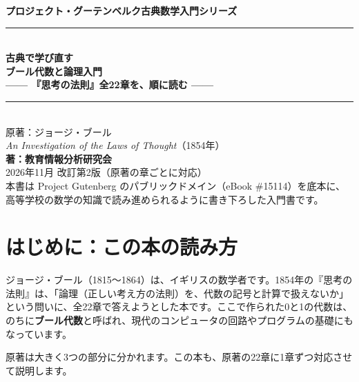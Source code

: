 \documentclass[a4paper,11pt,openany]{ltjsbook}
\begin{document}
\begin{titlepage}
\begin{center}
\vspace*{1.5cm}
{\Large\bfseries プロジェクト・グーテンベルク古典数学入門シリーズ}\\[0.8cm]
\rule{\textwidth}{1.5pt}\\[0.4cm]
{\Huge\bfseries 古典で学び直す\\ブール代数と論理入門}\\[0.4cm]
{\Large\bfseries —— 『思考の法則』全22章を、順に読む ——}\\[0.4cm]
\rule{\textwidth}{1.5pt}\\[1.5cm]
{\large 原著：ジョージ・ブール\\
\textit{An Investigation of the Laws of Thought}（1854年）}\\[2.0cm]
{\Large\bfseries 著：教育情報分析研究会}\\[2.5cm]
\vfill
{\large 2026年11月 改訂第2版（原著の章ごとに対応）}\\[0.5cm]
{\footnotesize 本書は Project Gutenberg のパブリックドメイン（eBook \#15114）を底本に、\\
高等学校の数学の知識で読み進められるように書き下ろした入門書です。}
\end{center}
\end{titlepage}

\frontmatter
\tableofcontents
\mainmatter

\chapter*{はじめに：この本の読み方}

ジョージ・ブール（1815〜1864）は、イギリスの数学者です。1854年の『思考の法則』は、「論理（正しい考え方の法則）を、代数の記号と計算で扱えないか」という問いに、全22章で答えようとした本です。ここで作られた0と1の代数は、のちに\textbf{ブール代数}と呼ばれ、現代のコンピュータの回路やプログラムの基礎にもなっています。

原著は大きく3つの部分に分かれます。この本も、原著の22章に1章ずつ対応させて説明します。
\end{document}
